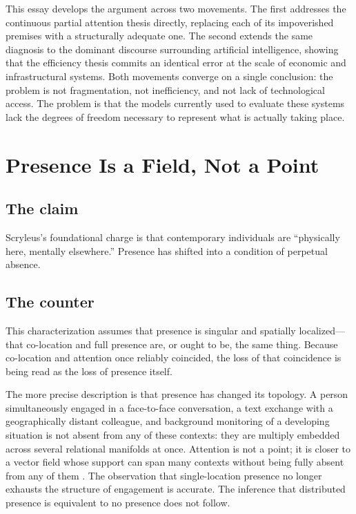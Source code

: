 \documentclass[12pt, a4paper]{article}
\begin{document}
This essay develops the argument across two movements. The first addresses the continuous partial attention thesis directly, replacing each of its impoverished premises with a structurally adequate one. The second extends the same diagnosis to the dominant discourse surrounding artificial intelligence, showing that the efficiency thesis commits an identical error at the scale of economic and infrastructural systems. Both movements converge on a single conclusion: the problem is not fragmentation, not inefficiency, and not lack of technological access. The problem is that the models currently used to evaluate these systems lack the degrees of freedom necessary to represent what is actually taking place.

\section{Presence Is a Field, Not a Point}

\subsection{The claim}
Scryleus's foundational charge is that contemporary individuals are ``physically here, mentally elsewhere.'' Presence has shifted into a condition of perpetual absence.

\subsection{The counter}
This characterization assumes that presence is singular and spatially localized---that co-location and full presence are, or ought to be, the same thing. Because co-location and attention once reliably coincided, the loss of that coincidence is being read as the loss of presence itself.

The more precise description is that presence has changed its topology. A person simultaneously engaged in a face-to-face conversation, a text exchange with a geographically distant colleague, and background monitoring of a developing situation is not absent from any of these contexts: they are multiply embedded across several relational manifolds at once. Attention is not a point; it is closer to a vector field whose support can span many contexts without being fully absent from any of them \cite{Friston2010}. The observation that single-location presence no longer exhausts the structure of engagement is accurate. The inference that distributed presence is equivalent to no presence does not follow.
\end{document}
